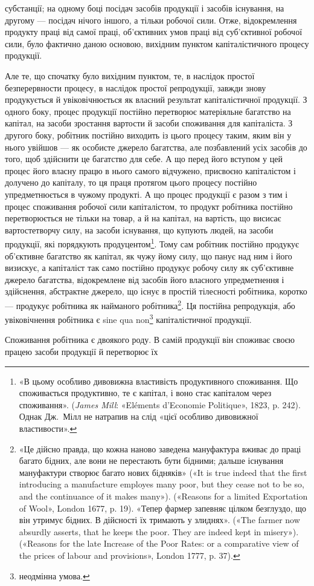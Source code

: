 \parcont{}  %
субстанції; на одному боці посідач засобів продукції і засобів
існування, на другому — посідач нічого іншого, а тільки робочої
сили. Отже, відокремлення продукту праці від самої праці, об’єктивних
умов праці від суб’єктивної робочої сили, було фактично
даною основою, вихідним пунктом капіталістичного процесу
продукції.

Але те, що спочатку було вихідним пунктом, те, в наслідок
простої безперервности процесу, в наслідок простої репродукції,
завжди знову продукується й увіковічнюється як власний результат
капіталістичної продукції. З одного боку, процес продукції
постійно перетворює матеріяльне багатство на капітал,
на засоби зростання вартости й засоби споживання для капіталіста.
З другого боку, робітник постійно виходить із цього процесу
таким, яким він у нього увійшов — як особисте джерело
багатства, але позбавлений усіх засобів до того, щоб здійснити
це багатство для себе. А що перед його вступом у цей процес
його власну працю в нього самого відчужено, присвоєно капіталістом
і долучено до капіталу, то ця праця протягом цього процесу
постійно упредметнюється в чужому продукті. А що процес
продукції є разом з тим і процес споживання робочої сили капіталістом,
то продукт робітника постійно перетворюється не
тільки на товар, а й на капітал, на вартість, що висисає вартостетворчу
силу, на засоби існування, що купують людей, на засоби
продукції, які порядкують продуцентом\footnote{
«В цьому особливо дивовижна властивість продуктивного споживання.
Що споживається продуктивно, те є капітал, і воно стає капіталом
через споживання». (\emph{James Mill}: «Eléments d’Economie Politique», 1823,
p. 242). Однак Дж.~Мілл не натрапив на слід «цієї особливо дивовижної
властивости».
}. Тому сам робітник
постійно продукує об’єктивне багатство як капітал, як чужу
йому силу, що панує над ним і його визискує, а капіталіст так
само постійно продукує робочу силу як суб’єктивне джерело
багатства, відокремлене від засобів його власного упредметнення
і здійснення, абстрактне джерело, що існує в простій тілесності
робітника, коротко — продукує робітника як найманого робітника\footnote{
«Це дійсно правда, що кожна наново заведена мануфактура вживає
до праці багато бідних, але вони не перестають бути бідними; дальше
існування мануфактури створює багато нових бідняків» («It is true indeed
that the first introducing a manufacture employes many poor, but
they cease not to be so, and the continuance of it makes many»). («Reasons
for a limited Exportation of Wool», London 1677, p. 19). «Тепер фармер
запевняє цілком безглуздо, що він утримує бідних. В дійсності їх тримають
у злиднях». («The farmer now absurdly asserts, that he keeps the
poor. They are indeed kept in misery»). («Reasons for the late Increase
of the Poor Rates: or a comparative view of the prices of labour and provisions»,
London 1777, p. 37).
}.
Ця постійна репродукція, або увіковічнення робітника
є sine qua non\footnote*{
неодмінна умова. 
} капіталістичної продукції.

Споживання робітника є двоякого роду. В самій продукції
він споживає своєю працею засоби продукції й перетворює їх
\parbreak{}  %
